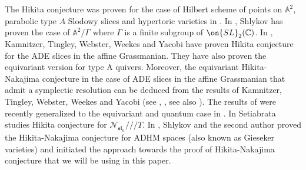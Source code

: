 \documentclass[12pt]{amsart}
\begin{document}
    The Hikita conjecture was proven for the case of Hilbert scheme of points on $\mathbb{A}^2$, parabolic type $A$ Slodowy slices and hypertoric varieties in \cite[Theorem 1.1, Theorem A.1, Theorem B.1]{Hikita}. In \cite{Shlykov2020}, Shlykov has proven the case of $\mathbb{A}^2/\Gamma$ where $\Gamma$ is a finite subgroup of $\on{SL}_2(\mathbb{C})$.  
    In \cite[Theorem 1.5]{KamnitzerTingleyWebsterWeeksYacobi}, Kamnitzer, Tingley, Webster, Weekes and Yacobi have proven Hikita conjecture for the ADE slices in the affine Grassmanian. 
    They have also proven the equivariant version for type A quivers. Moreover,  the equivariant Hikita-Nakajima conjecture in the case of ADE slices in the affine Grassmanian that admit a symplectic resolution can be deduced from the results of Kamnitzer, Tingley, Webster, Weekes and Yacobi (see \cite[Section 8.3]{KamnitzerTingleyWebsterWeeksYacobi}, \cite[Section 1.3 and Theorem 1.5]{catO_yang}, see also \cite[Section 6.6]{Kamnitzer_symplectic}). The results of \cite{Shlykov2020} were recently generalized to the equivariant and quantum case in \cite{chen2024}. In \cite{linus_hikita} Setiabrata studies Hikita conjecture for $\mathcal{N}_{\mathfrak{sl}_n}/\!/\!/T$. In \cite{ksh}, Shlykov and the second author proved the Hikita-Nakajima conjecture for ADHM spaces (also known as Gieseker varieties) and initiated the approach towards the proof of Hikita-Nakajima conjecture that we will be using in this paper.
    
 
\end{document}
